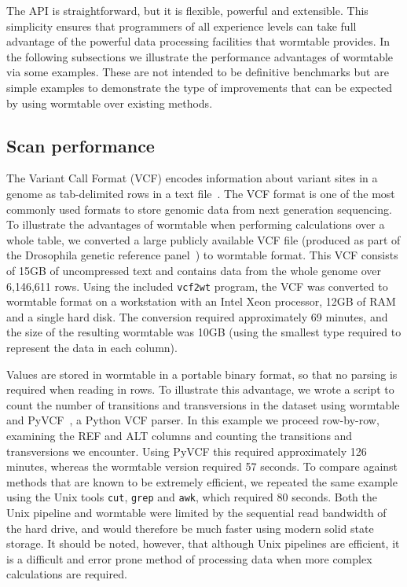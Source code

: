 \documentclass[10pt]{bmc_article}
\newenvironment{bmcformat}{\begin{raggedright}\baselineskip20pt\sloppy\setboolean{publ}{false}}{\end{raggedright}\baselineskip20pt\sloppy}
\begin{document}
\begin{bmcformat}
The API is straightforward, but it is flexible, powerful and 
extensible. This simplicity ensures that 
programmers of all experience levels  
can take full advantage of the powerful data 
processing facilities that wormtable provides. In the following subsections 
we illustrate the performance advantages of wormtable via some 
examples. These are not intended to be definitive benchmarks
but are simple examples to demonstrate the type of improvements 
that can be expected by using wormtable over existing methods.

\subsection*{Scan performance}
The Variant Call Format (VCF) encodes information about variant sites in a genome 
as tab-delimited rows in a text file~\cite{da+11}. The VCF format is one of 
the most commonly used formats to store genomic data from next generation sequencing.
To illustrate the advantages of wormtable when performing calculations over 
a whole table, we converted a large 
publicly available VCF file (produced as part of the
Drosophila genetic reference panel~\cite{mr+12}) to wormtable format.
This VCF\cite{freeze.vcf}
consists of 15GB of uncompressed text and contains data from the 
whole genome over 6,146,611 rows.
Using the included \texttt{vcf2wt} program,
the VCF was converted to wormtable format 
on a workstation with an Intel Xeon processor, 12GB of RAM 
and a single hard disk. The
conversion required approximately 69 minutes, and the size of the resulting  
wormtable was 10GB (using the smallest type required
to represent the data in each column).

Values are stored in wormtable in a portable binary format, so that no parsing is
required when reading in rows. To illustrate this advantage, we
wrote a script to count the number of transitions and transversions
in the dataset using wormtable and PyVCF~\cite{pyvcf},
a Python VCF parser.  In this example we proceed 
row-by-row, examining the REF and ALT columns and
counting the transitions and transversions we encounter. 
Using PyVCF this required approximately 126 minutes, whereas 
the wormtable version required
57 seconds. To compare against methods that are known to be extremely
efficient, we repeated the same 
example using the Unix tools \texttt{cut}, \texttt{grep} 
and \texttt{awk},  which required 80 seconds. Both the
Unix pipeline and wormtable were limited by the sequential read
bandwidth of the hard drive, and would therefore be much 
faster using modern solid state storage.
It should be noted, however, that although Unix 
pipelines are efficient, it is a difficult and error prone method 
of processing data when more complex calculations are required.


\end{bmcformat}
\end{document}
